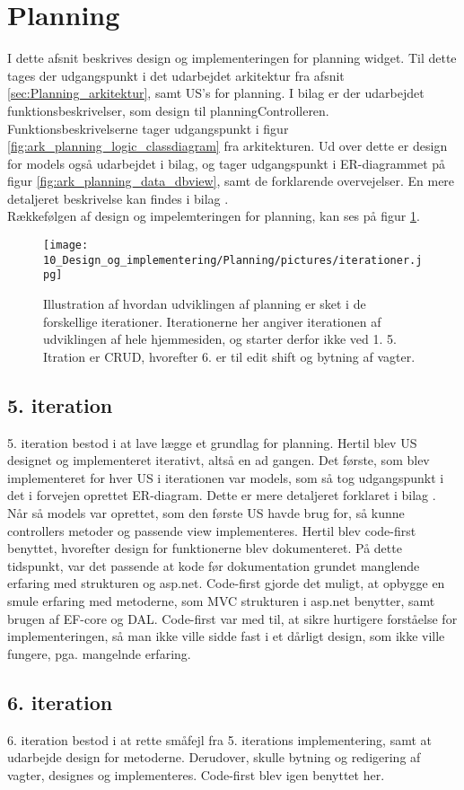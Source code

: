 \section{Planning}
I dette afsnit beskrives design og implementeringen for planning widget. Til dette tages der udgangspunkt i det udarbejdet arkitektur fra afsnit \ref{sec:Planning_arkitektur}, samt US's for planning. I bilag\cite{DesignOgImplPlanning} er der udarbejdet funktionsbeskrivelser, som design til planningControlleren. Funktionsbeskrivelserne tager udgangspunkt i figur \ref{fig:ark_planning_logic_classdiagram} fra arkitekturen. Ud over dette er design for models også udarbejdet i bilag, og tager udgangspunkt i ER-diagrammet på figur \ref{fig:ark_planning_data_dbview}, samt de forklarende overvejelser. En mere detaljeret beskrivelse kan findes i bilag \cite{DesignOgImplPlanning}. \\

\noindent Rækkefølgen af design og impelemteringen for planning, kan ses på figur \ref{fig:planning_iterations}.

\begin{figure}[H]
  \texttt{[image: 10\_Design\_og\_implementering/Planning/pictures/iterationer.jpg]}
  \centering
  \caption{Illustration af hvordan udviklingen af planning er sket i de forskellige iterationer. Iterationerne her angiver iterationen af udviklingen af hele hjemmesiden, og starter derfor ikke ved 1. 5. Itration er CRUD, hvorefter 6. er til edit shift og bytning af vagter.}
  \label{fig:planning_iterations}
\end{figure}

\subsection{5. iteration}
5. iteration bestod i at lave lægge et grundlag for planning. Hertil blev US designet og implementeret iterativt, altså en ad gangen. Det første, som blev implementeret for hver US i iterationen var models, som så tog udgangspunkt i det i forvejen oprettet ER-diagram. Dette er mere detaljeret forklaret i bilag \cite{DesignOgImplPlanning}. Når så models var oprettet, som den første US havde brug for, så kunne controllers metoder og passende view implementeres. Hertil blev code-first benyttet, hvorefter design for funktionerne blev dokumenteret. På dette tidspunkt, var det passende at kode før dokumentation grundet manglende erfaring med strukturen og asp.net. Code-first gjorde det muligt, at opbygge en smule erfaring med metoderne, som MVC strukturen i asp.net benytter, samt brugen af EF-core og DAL. Code-first var med til, at sikre hurtigere forståelse for implementeringen, så man ikke ville sidde fast i et dårligt design, som ikke ville fungere, pga. mangelnde erfaring. 

\subsection{6. iteration}
6. iteration bestod i at rette småfejl fra 5. iterations implementering, samt at udarbejde design for metoderne. Derudover, skulle bytning og redigering af vagter, designes og implementeres. Code-first blev igen benyttet her. 